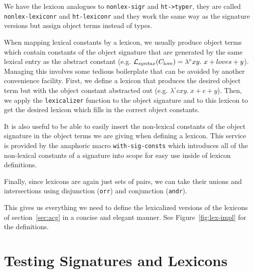 We have the lexicon analogues to \texttt{nonlex-sigr} and
\texttt{ht->typer}, they are called \texttt{nonlex-lexiconr} and
\texttt{ht-lexiconr} and they work the same way as the signature
versions but assign object terms instead of types.

When mapping lexical constants by a lexicon, we usually produce object
terms which contain constants of the object signature that are generated
by the same lexical entry as the abstract constant
(e.g. $\mathcal{L}_{syntax}(C_{\textrm{love}}) = \lambda^{\circ} x y.\ x +
loves + y$). Managing this involves some tedious boilerplate that can be
avoided by another convenience facility. First, we define a lexicon that
produces the desired object term but with the object constant abstracted
out (e.g. $\lambda^{\circ} c x y.\ x + c + y$). Then, we apply the
\texttt{lexicalizer} function to the object signature and to this
lexicon to get the desired lexicon which fills in the correct object
constants.

It is also useful to be able to easily insert the non-lexical constants
of the object signature in the object terms we are giving when defining
a lexicon. This service is provided by the anaphoric macro
\texttt{with-sig-consts} which introduces all of the non-lexical
constants of a signature into scope for easy use inside of lexicon
definitions.

Finally, since lexicons are again just sets of pairs, we can take their
unions and intersections using disjunction (\texttt{orr}) and
conjunction (\texttt{andr}).

This gives us everything we need to define the lexicalized versions of
the lexicons of section~\ref{sec:acg} in a concise and elegant
manner. See Figure~\ref{fig:lex-impl} for the definitions.


\section{Testing Signatures and Lexicons}
